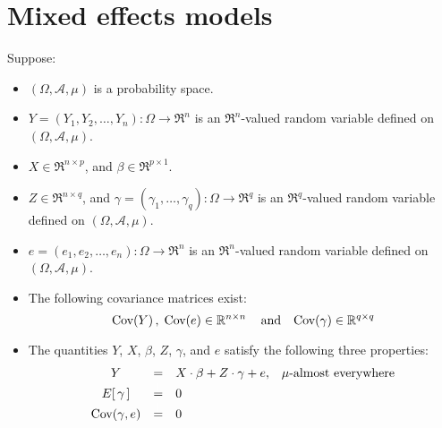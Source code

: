 

\section{Mixed effects models}
\setcounter{theorem}{0}
\setcounter{equation}{0}

\renewcommand{\theenumi}{\roman{enumi}}
\renewcommand{\labelenumi}{\textnormal{(\theenumi)}$\;\;$}


\begin{theorem}
\label{AMixedModelEquivalentFixedModel}
\mbox{}
\vskip 0.2cm
\noindent
Suppose:
\begin{itemize}
\item
	$(\Omega,\mathcal{A},\mu)$ is a probability space.
\item
	$Y = (Y_{1}, Y_{2}, \ldots, Y_{n}) : \Omega \longrightarrow \Re^{n}$ is an $\Re^{n}$-valued random variable
	defined on $(\Omega,\mathcal{A},\mu)$.
\item
	$X \in \Re^{n \times p}$, and $\beta \in \Re^{p \times 1}$.
\item
	$Z \in \Re^{n \times q}$, and
	$\gamma = (\gamma_{1},\ldots,\gamma_{q}) : \Omega \longrightarrow \Re^{q}$
	is an $\Re^{q}$-valued random variable defined on $(\Omega,\mathcal{A},\mu)$.
\item
	$e = (e_{1}, e_{2}, \ldots, e_{n}) : \Omega \longrightarrow \Re^{n}$ is an $\Re^{n}$-valued random variable
	defined on $(\Omega,\mathcal{A},\mu)$.
\item
	The following covariance matrices exist:
	\begin{equation*}
	\textnormal{Cov}(Y)\,, \; \textnormal{Cov}(e) \in \mathbb{R}^{n \times n}\,
	\quad\textnormal{and}\quad
	\textnormal{Cov}(\gamma) \in \mathbb{R}^{q \times q}
	\end{equation*}
\item
	The quantities $Y$, $X$, $\beta$, $Z$, $\gamma$, and $e$ satisfy the following three properties:
	\begin{equation*}
	\begin{array}{ccll}
	Y & = & X \cdot \beta + Z \cdot \gamma + e, & \textnormal{$\mu$-almost everywhere}
	\\
	E\!\left[\,\gamma\,\right] &\overset{{\color{white}\vert}}{=}& 0
	\\
	\Cov\!\left(\gamma,e\right) &\overset{{\color{white}\vert}}{=}& 0	

\end{array}
\end{equation*}
\end{itemize}
\end{theorem}
